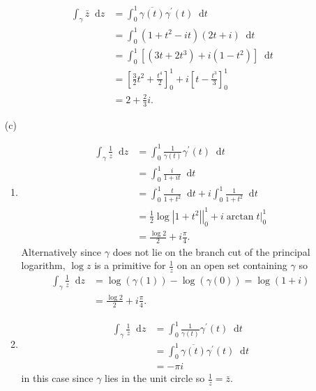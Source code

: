 \documentclass{article}
\newcommand\dif{\mathop{}\!\mathrm{d}}
\begin{document}
\begin{itemize}
{\begin{enumerate}[label=(\alph*)]
{\begin{align*}
           \int_\gamma \bar{z} \dif z
        &= \int_0^1 \overline{\gamma(t)} \gamma^\prime(t) \dif t \\
        &= \int_0^1 (1 + t^2 - it)(2t + i) \dif t \\
        &= \int_0^1 [(3t + 2t^3) + i(1 - t^2)] \dif t \\
        &= \left[\frac{3}{2}t^2 + \frac{t^4}{2}\right]_0^1
         + i\left[t - \frac{t^3}{3}\right]_0^1 \\
        &= 2 + \frac{2}{3}i.
        \end{align*}
      }
    \end{enumerate}
  }
  \item[(c)]{
    \begin{enumerate}[label=(\alph*)]
      \item{
        \begin{align*}
           \int_\gamma \frac{1}{z} \dif z
        &= \int_0^1 \frac{1}{\gamma(t)} \gamma^\prime(t) \dif t \\
        &= \int_0^1 \frac{i}{1 + it} \dif t \\
        &= \int_0^1 \frac{t}{1 + t^2} \dif t
         + i\int_0^1 \frac{1}{1 + t^2} \dif t \\
        &= \left.\frac{1}{2} \log |1 + t^2|\right|_0^1
         + i\left.\arctan t\right|_0^1 \\
        &= \frac{\log 2}{2} + i\frac{\pi}{4}.
        \end{align*}
        Alternatively since $\gamma$ does not lie on
        the branch cut of the principal logarithm,
        $\log z$ is a primitive for $\frac{1}{z}$ on
        an open set containing $\gamma$ so
        \begin{align*}
           \int_{\gamma} \frac{1}{z} \dif z
        &= \log (\gamma(1)) - \log(\gamma(0))
         = \log (1 + i) \\
        &= \frac{\log 2}{2} + i\frac{\pi}{4}.
        \end{align*}
      }
      \item{
        \begin{align*}
           \int_\gamma \frac{1}{z} \dif z
        &= \int_0^1 \frac{1}{\gamma(t)} \gamma^\prime(t) \dif t \\
        &= \int_0^1 \overline{\gamma(t)} \gamma^\prime(t) \dif t \\
        &= -\pi i
        \end{align*}
        in this case since $\gamma$ lies in the unit circle so
        $\frac{1}{z} = \bar{z}$.
      }

\end{enumerate}}
\end{itemize}
\end{document}
